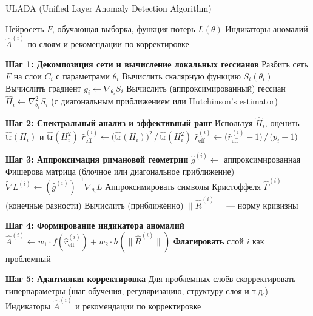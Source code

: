 \documentclass[a4paper,12pt]{article}
\begin{document}
\begin{algorithm}
\caption{ULADA (Unified Layer Anomaly Detection Algorithm)}
\label{alg:ulada}
\begin{algorithmic}[1]

\Require Нейросеть $F$, обучающая выборка, функция потерь $L(\theta)$
\Ensure Индикаторы аномалий $\hat{A}^{(i)}$ по слоям и рекомендации по корректировке

\Statex

\State \textbf{Шаг 1: Декомпозиция сети и вычисление локальных гессианов}
\State Разбить сеть $F$ на слои $C_i$ с параметрами $\theta_i$
  \State Вычислить скалярную функцию $S_i(\theta_i)$
  \State Вычислить градиент $g_i \gets \nabla_{\theta_i} S_i$
  \State Вычислить (аппроксимированный) гессиан $\hat{H}_i \gets \nabla^2_{\theta_i} S_i$ (с диагональным приближением или Hutchinson’s estimator)
\EndFor

\Statex

\State \textbf{Шаг 2: Спектральный анализ и эффективный ранг}
  \State Используя $\hat{H}_i$, оценить $\widehat{\mathrm{tr}}(H_i)$ и $\widehat{\mathrm{tr}}(H_i^2)$
  \State $\widehat{r}_{\text{eff}}^{(i)} \gets \Big(\widehat{\mathrm{tr}}(H_i)\Big)^2 \,/\, \widehat{\mathrm{tr}}(H_i^2)$
  \State $\hat{r}_{\text{eff}}^{(i)} \gets \big(\widehat{r}_{\text{eff}}^{(i)} - 1\big)\,/\,\big(p_i - 1\big)$
\EndFor

\Statex

\State \textbf{Шаг 3: Аппроксимация римановой геометрии}
  \State $\hat{g}^{(i)} \gets$ аппроксимированная Фишерова матрица (блочное или диагональное приближение)
  \State $\tilde{\nabla} L^{(i)} \gets (\hat{g}^{(i)})^{-1} \nabla_{\theta_i} L$
  \State Аппроксимировать символы Кристоффеля $\hat{\Gamma}^{(i)}$ (конечные разности)
  \State Вычислить (приближённо) $\|\hat{R}^{(i)}\|$ --- норму кривизны
\EndFor

\Statex

\State \textbf{Шаг 4: Формирование индикатора аномалий}
  \State $\hat{A}^{(i)} \gets w_1 \cdot f(\hat{r}_{\text{eff}}^{(i)}) + w_2 \cdot h(\|\hat{R}^{(i)}\|)$
    \State \textbf{Флагировать} слой $i$ как проблемный
  \EndIf
\EndFor

\Statex

\State \textbf{Шаг 5: Адаптивная корректировка}
\State Для проблемных слоёв скорректировать гиперпараметры (шаг обучения, регуляризацию, структуру слоя и т.д.)
\State \Return Индикаторы $\hat{A}^{(i)}$ и рекомендации по корректировке

\end{algorithmic}
\end{algorithm}
\end{document}
